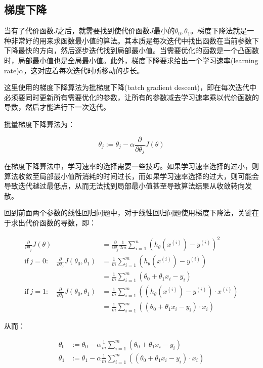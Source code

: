 \documentclass[12pt, a4paper]{article}
\begin{document}
        \subsection{梯度下降}
           当有了代价函数$J$之后，就需要找到使代价函数$J$最小的$\theta_0, \theta_1$。梯度下降法就是一种非常好的用来求函数最小值的算法。其本质是每次迭代中找出函数在当前参数下下降最快的方向，然后逐步迭代找到局部最小值。当需要优化的函数是一个凸函数时，局部最小值也是全局最小值。此外，梯度下降要求给出一个学习速率(learning rate)$\alpha$，这对应着每次迭代时所移动的步长。

           这里使用的梯度下降算法为批梯度下降(batch gradient descent)，即在每次迭代中必须要同时更新所有需要优化的参数，让所有的参数减去学习速率乘以代价函数的导数，然后才能进行下一次迭代。

           批量梯度下降算法为：

           \begin{equation*}
               \theta_j:=\theta_j-\alpha\frac{\partial}{\partial\theta_j}J(\theta)
           \end{equation*}

           在梯度下降算法中，学习速率的选择需要一些技巧。如果学习速率选择的过小，则算法收敛至局部最小值所消耗的时间过长，而如果学习速率选择的过大，则可能会导致迭代越过最低点，从而无法找到局部最小值甚至导致算法结果从收敛转向发散。

           回到前面两个参数的线性回归问题中，对于线性回归问题使用梯度下降法，关键在于求出代价函数的导数，即：

           \begin{align*}
               \frac{\partial}{\partial\theta_j}J(\theta)&=\frac{\partial}{\partial\theta_j}\frac{1}{2m}\sum_{i=1}^{n}(h_\theta(x^{(i)})-y^{(i)})^2 \\
               \text{if}\ j=0:\quad\frac{\partial}{\partial\theta_0}J(\theta_0,\theta_1)&=\frac{1}{m}\sum_{i=1}^{m}(h_\theta(x^{(i)})-y^{(i)}) \\
               &=\frac{1}{m}\sum_{i=1}^{m}(\theta_0+\theta_1x_i-y_i)\\
               \text{if}\ j=1:\quad\frac{\partial}{\partial\theta_1}J(\theta_0,\theta_1)&=\frac{1}{m}\sum_{i=1}^{m}((h_\theta(x^{(i)})-y^{(i)})\cdot x^{(i)})\\
               &=\frac{1}{m}\sum_{i=1}^{m}((\theta_0+\theta_1x_i-y_i)\cdot x_i)
           \end{align*}

           从而：

           \begin{align*}
               \theta_0&:=\theta_0-\alpha\frac{1}{m}\sum_{i=1}^{m}(\theta_0+\theta_1x_i-y_i)\\
               \theta_1&:=\theta_1-\alpha\frac{1}{m}\sum_{i=1}^{m}((\theta_0+\theta_1x_i-y_i)\cdot x_i)
           \end{align*}
\end{document}
